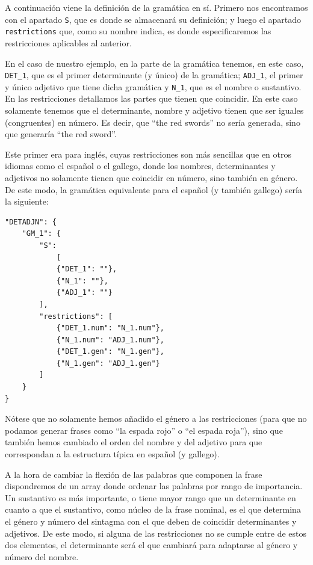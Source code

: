 A continuación viene la definición de la gramática en sí. Primero nos encontramos con el apartado \texttt{S}, que es donde se almacenará su definición; y luego el apartado \texttt{restrictions} que, como su nombre indica, es donde especificaremos las restricciones aplicables al anterior.

En el caso de nuestro ejemplo, en la parte de la gramática tenemos, en este caso, \texttt{DET\_1}, que es el primer determinante (y único) de la gramática; \texttt{ADJ\_1}, el primer y único adjetivo que tiene dicha gramática y \texttt{N\_1}, que es el nombre o sustantivo.
En las restricciones detallamos las partes que tienen que coincidir. En este caso solamente tenemos que el determinante, nombre y adjetivo tienen que ser iguales (congruentes) en número. Es decir, que ``the red swords'' no sería generada, sino que generaría ``the red sword''.

Este primer era para inglés, cuyas restricciones son más sencillas que en otros idiomas como el español o el gallego, donde los nombres, determinantes y adjetivos no solamente tienen que coincidir en número, sino también en género. De este modo, la gramática equivalente para el español (y también gallego) sería la siguiente:

\begin{lstlisting}[style=json]
"DETADJN": {
    "GM_1": {
        "S": 
            [
            {"DET_1": ""},
            {"N_1": ""},
            {"ADJ_1": ""}
        ],
        "restrictions": [
            {"DET_1.num": "N_1.num"},
            {"N_1.num": "ADJ_1.num"},
            {"DET_1.gen": "N_1.gen"},
            {"N_1.gen": "ADJ_1.gen"}
        ]
    }
}
\end{lstlisting}

\noindent Nótese que no solamente hemos añadido el género a las restricciones (para que no podamos generar frases como ``la espada rojo'' o ``el espada roja''), sino que también hemos cambiado el orden del nombre y del adjetivo para que correspondan a la estructura típica en español (y gallego). 

A la hora de cambiar la flexión de las palabras que componen la frase dispondremos de un array donde ordenar las palabras por rango de importancia. Un sustantivo es más importante, o tiene mayor rango que un determinante en cuanto a que el sustantivo, como núcleo de la frase nominal, es el que determina el género y número del sintagma con el que deben de coincidir determinantes y adjetivos. De este modo, si alguna de las restricciones no se cumple entre de estos dos elementos, el determinante será el que cambiará para adaptarse al género y número del nombre.

